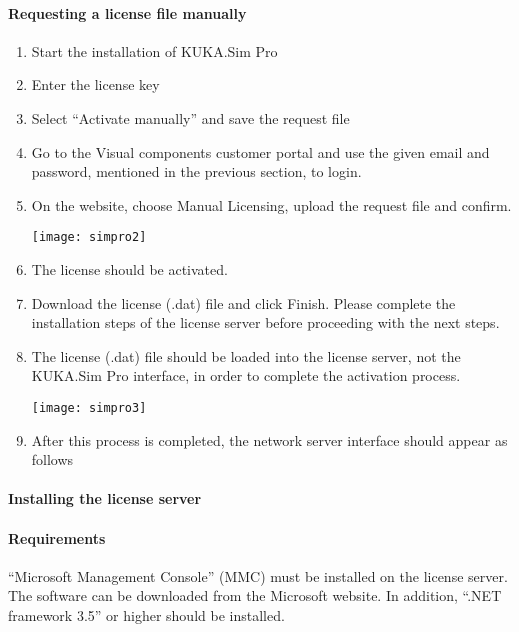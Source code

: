 				\paragraph{Requesting a license file manually}
 					\begin{enumerate}
 						\item Start the installation of KUKA.Sim Pro 
 						\item Enter the license key
 						\item Select “Activate manually” and save the request file
 						\item Go to the Visual components customer portal and use the given email and password, mentioned in the previous section, to login.
 						\item On the website, choose Manual Licensing, upload the request file and confirm.
 						
 						\begin{center}
                 	\texttt{[image: simpro2]}
 						\end{center}
 					
 					
 						
 						\item The license should be activated.
 						\item Download the license (.dat) file and click Finish. Please complete the installation steps of the license server before proceeding with the next steps.
 						\item The license (.dat) file should be loaded into the license server, not the KUKA.Sim Pro interface, in order to complete the activation process. 
                         \begin{center}
                 	\texttt{[image: simpro3]}
                         \end{center}

 						\item After this process is completed, the network server interface should appear as follows
 					\end{enumerate}
 				
 				\paragraph{Installing the license server}
 				\paragraph{Requirements}
 				“Microsoft Management Console” (MMC) must be installed on the license server. The software can be downloaded from the Microsoft website. In addition, “.NET framework 3.5” or higher should be installed. 
 				

